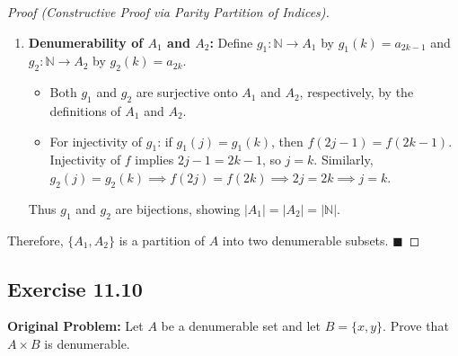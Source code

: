 \documentclass[11pt, letterpaper]{article}
\theoremstyle{definition}
\theoremstyle{remark}
\begin{document}
\begin{proof}[Proof (Constructive Proof via Parity Partition of Indices)]
\begin{enumerate}[label=(\arabic*)]
    \item \textbf{Denumerability of $A_1$ and $A_2$:} Define $g_1 : \mathbb{N} \to A_1$ by $g_1(k) = a_{2k - 1}$ and $g_2 : \mathbb{N} \to A_2$ by $g_2(k) = a_{2k}$.
    \begin{itemize}
        \item Both $g_1$ and $g_2$ are surjective onto $A_1$ and $A_2$, respectively, by the definitions of $A_1$ and $A_2$.
        \item For injectivity of $g_1$: if $g_1(j) = g_1(k)$, then $f(2j - 1) = f(2k - 1)$. Injectivity of $f$ implies $2j - 1 = 2k - 1$, so $j = k$. Similarly, $g_2(j) = g_2(k) \implies f(2j) = f(2k) \implies 2j = 2k \implies j = k$.
    \end{itemize}
    Thus $g_1$ and $g_2$ are bijections, showing $|A_1| = |A_2| = |\mathbb{N}|$.
\end{enumerate}
Therefore, $\{A_1, A_2\}$ is a partition of $A$ into two denumerable subsets. $\blacksquare$
\end{proof}

\subsection*{Exercise 11.10}
\textbf{Original Problem:} Let $A$ be a denumerable set and let $B = \{x, y\}$. Prove that $A \times B$ is denumerable.
\end{document}
